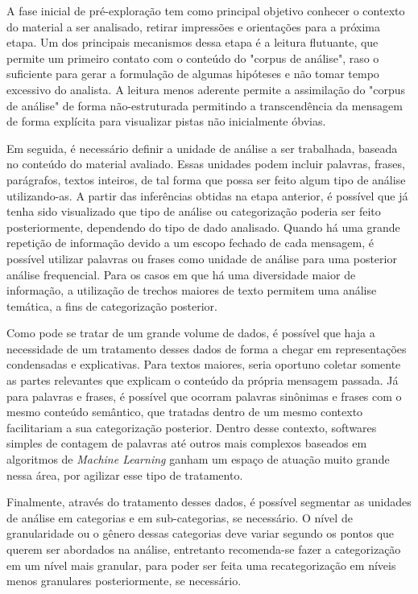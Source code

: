 A fase inicial de pré-exploração tem como principal objetivo conhecer o contexto do material a ser analisado, retirar impressões e orientações para a próxima etapa. Um dos principais mecanismos dessa etapa é a leitura flutuante, que permite um primeiro contato com o conteúdo do "corpus de análise", raso o suficiente para gerar a formulação de algumas hipóteses e não tomar tempo excessivo do analista. A leitura menos aderente permite a assimilação do "corpus de análise" de forma não-estruturada permitindo a transcendência da mensagem de forma explícita para visualizar pistas não inicialmente óbvias.

Em seguida, é necessário definir a unidade de análise a ser trabalhada, baseada no conteúdo do material avaliado. Essas unidades podem incluir palavras, frases, parágrafos, textos inteiros, de tal forma que possa ser feito algum tipo de análise utilizando-as. A partir das inferências obtidas na etapa anterior, é possível que já tenha sido visualizado que tipo de análise ou categorização poderia ser feito posteriormente, dependendo do tipo de dado analisado. Quando há uma grande repetição de informação devido a um escopo fechado de cada mensagem, é possível utilizar palavras ou frases como unidade de análise para uma posterior análise frequencial. Para os casos em que há uma diversidade maior de informação, a utilização de trechos maiores de texto permitem uma análise temática, a fins de categorização posterior.

Como pode se tratar de um grande volume de dados, é possível que haja a necessidade de um tratamento desses dados de forma a chegar em representações condensadas e explicativas. Para textos maiores, seria oportuno coletar somente as partes relevantes que explicam o conteúdo da própria mensagem passada. Já para palavras e frases, é possível que ocorram palavras sinônimas e frases com o mesmo conteúdo semântico, que tratadas dentro de um mesmo contexto facilitariam a sua categorização posterior. Dentro desse contexto, softwares simples de contagem de palavras até outros mais complexos baseados em algoritmos de \textit{Machine Learning} ganham um espaço de atuação muito grande nessa área, por agilizar esse tipo de tratamento.

Finalmente, através do tratamento desses dados, é possível segmentar as unidades de análise em categorias e em sub-categorias, se necessário. O nível de granularidade ou o gênero dessas categorias deve variar segundo os pontos que querem ser abordados na análise, entretanto recomenda-se fazer a categorização em um nível mais granular, para poder ser feita uma recategorização em níveis menos granulares posteriormente, se necessário.

